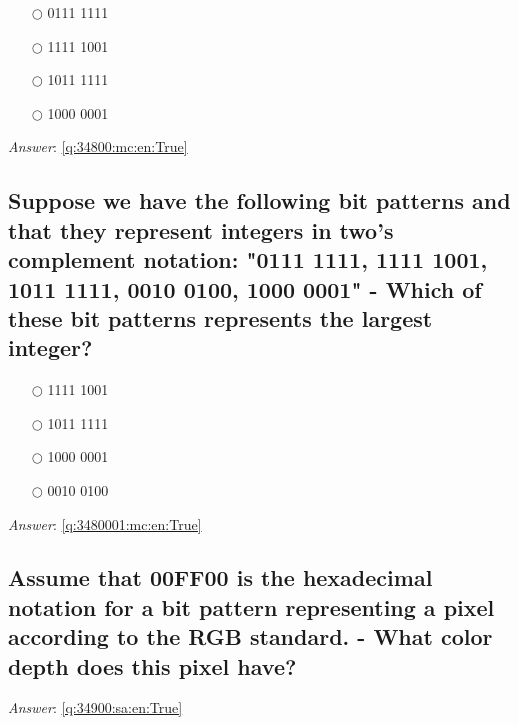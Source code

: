 \documentclass[a4paper,11pt,oneside]{article}
\begin{document}
\begin{sloppypar}
\label{q:34800:mc:en:False}

\begin{itemize}
  \item[$\bigcirc$] 0111 1111
  \item[$\bigcirc$] 1111 1001
  \item[$\bigcirc$] 1011 1111
  \item[$\bigcirc$] 1000 0001
\end{itemize}

\vspace{1cm}

\textit{Answer}: \autoref{q:34800:mc:en:True}

\subsection{Suppose we have the following bit patterns and that they represent integers in two's complement notation: "0111 1111, 1111 1001, 1011 1111, 0010 0100, 1000 0001" - Which of these bit patterns represents the largest integer?}

\label{q:3480001:mc:en:False}

\begin{itemize}
  \item[$\bigcirc$] 1111 1001
  \item[$\bigcirc$] 1011 1111
  \item[$\bigcirc$] 1000 0001
  \item[$\bigcirc$] 0010 0100
\end{itemize}

\vspace{1cm}

\textit{Answer}: \autoref{q:3480001:mc:en:True}



\subsection{Assume that 00FF00 is the hexadecimal notation for a bit pattern representing a pixel according to the RGB standard. - What color depth does this pixel have?}

\label{q:34900:sa:en:False}

\vspace{2cm}

\noindent\makebox[\textwidth]{\hrulefill}

\vspace{1cm}

\textit{Answer}: \autoref{q:34900:sa:en:True}


\end{sloppypar}
\end{document}
